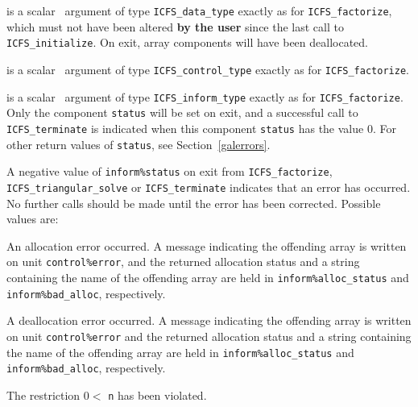 \documentclass{galahad}
\newcommand{\packagename}{ICFS}
\begin{document}
\vspace*{-1mm}
\begin{description}

 is a scalar \intentinout\ argument of type
{\tt \packagename\_data\_type}
exactly as for
{\tt \packagename\_factorize},
which must not have been altered {\bf by the user} since the last call to
{\tt \packagename\_initialize}.
On exit, array components will have been deallocated.

 is a scalar \intentin\ argument of type
{\tt \packagename\_control\_type}
exactly as for
{\tt \packagename\_factorize}.

 is a scalar \intentout\ argument of type
{\tt \packagename\_inform\_type}
exactly as for
{\tt \packagename\_factorize}.
Only the component {\tt status} will be set on exit, and a
successful call to
{\tt \packagename\_terminate}
is indicated when this  component {\tt status} has the value 0.
For other return values of {\tt status}, see Section~\ref{galerrors}.

\end{description}


\galerrors
A negative value of {\tt inform\%status} on exit from
{\tt \packagename\_factorize},
{\tt \packagename\_triangular\_solve}
or
{\tt \packagename\_terminate}
indicates that an error has occurred. No further calls should be made
until the error has been corrected. Possible values are:

\begin{description}

 An allocation error occurred.
A message indicating the offending
array is written on unit {\tt control\%error}, and the returned allocation
status and a string containing the name of the offending array
are held in {\tt inform\%alloc\_\-status}
and {\tt inform\%bad\_alloc}, respectively.

 A deallocation error occurred.
A message indicating the offending
array is written on unit {\tt control\%error} and the returned allocation
status and a string containing the name of the offending array
are held in {\tt inform\%alloc\_\-status}
and {\tt inform\%bad\_alloc}, respectively.

The restriction
$0 <$ {\tt n}
 has been violated.

\end{description}
\end{document}
